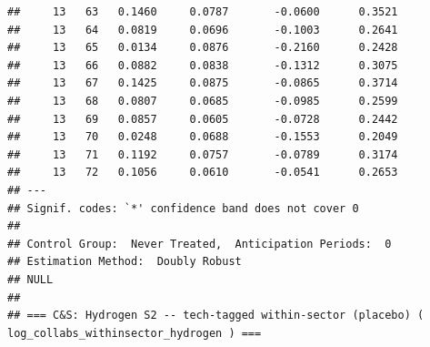 \documentclass[
]{article}
\begin{document}
\begin{verbatim}
##     13   63   0.1460     0.0787       -0.0600      0.3521  
##     13   64   0.0819     0.0696       -0.1003      0.2641  
##     13   65   0.0134     0.0876       -0.2160      0.2428  
##     13   66   0.0882     0.0838       -0.1312      0.3075  
##     13   67   0.1425     0.0875       -0.0865      0.3714  
##     13   68   0.0807     0.0685       -0.0985      0.2599  
##     13   69   0.0857     0.0605       -0.0728      0.2442  
##     13   70   0.0248     0.0688       -0.1553      0.2049  
##     13   71   0.1192     0.0757       -0.0789      0.3174  
##     13   72   0.1056     0.0610       -0.0541      0.2653  
## ---
## Signif. codes: `*' confidence band does not cover 0
## 
## Control Group:  Never Treated,  Anticipation Periods:  0
## Estimation Method:  Doubly Robust
## NULL
## 
## === C&S: Hydrogen S2 -- tech-tagged within-sector (placebo) ( log_collabs_withinsector_hydrogen ) ===
\end{verbatim}
\end{document}
